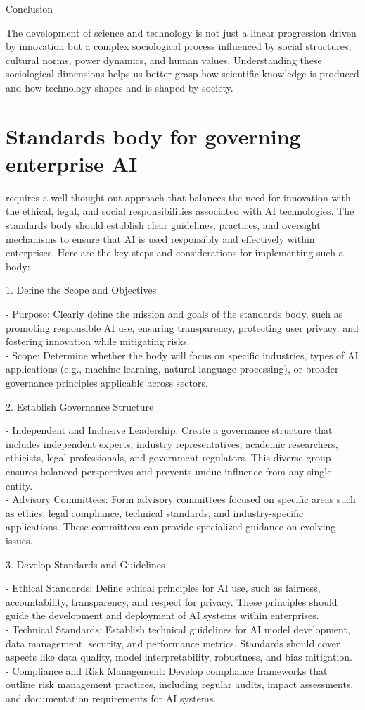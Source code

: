 Conclusion

The development of science and technology is not just a linear
progression driven by innovation but a complex sociological process
influenced by social structures, cultural norms, power dynamics, and
human values. Understanding these sociological dimensions helps us
better grasp how scientific knowledge is produced and how technology
shapes and is shaped by society.

\section{Standards body for governing enterprise
AI}\label{standards-body-for-governing-enterprise-ai}

requires a well-thought-out approach that balances the need for
innovation with the ethical, legal, and social responsibilities
associated with AI technologies. The standards body should establish
clear guidelines, practices, and oversight mechanisms to ensure that AI
is used responsibly and effectively within enterprises. Here are the key
steps and considerations for implementing such a body:

1. Define the Scope and Objectives

- Purpose: Clearly define the mission and goals of the standards body,
such as promoting responsible AI use, ensuring transparency, protecting
user privacy, and fostering innovation while mitigating risks.\\
- Scope: Determine whether the body will focus on specific industries,
types of AI applications (e.g., machine learning, natural language
processing), or broader governance principles applicable across sectors.

2. Establish Governance Structure

- Independent and Inclusive Leadership: Create a governance structure
that includes independent experts, industry representatives, academic
researchers, ethicists, legal professionals, and government regulators.
This diverse group ensures balanced perspectives and prevents undue
influence from any single entity.\\
- Advisory Committees: Form advisory committees focused on specific
areas such as ethics, legal compliance, technical standards, and
industry-specific applications. These committees can provide specialized
guidance on evolving issues.

3. Develop Standards and Guidelines

- Ethical Standards: Define ethical principles for AI use, such as
fairness, accountability, transparency, and respect for privacy. These
principles should guide the development and deployment of AI systems
within enterprises.\\
- Technical Standards: Establish technical guidelines for AI model
development, data management, security, and performance metrics.
Standards should cover aspects like data quality, model
interpretability, robustness, and bias mitigation.\\
- Compliance and Risk Management: Develop compliance frameworks that
outline risk management practices, including regular audits, impact
assessments, and documentation requirements for AI systems.

